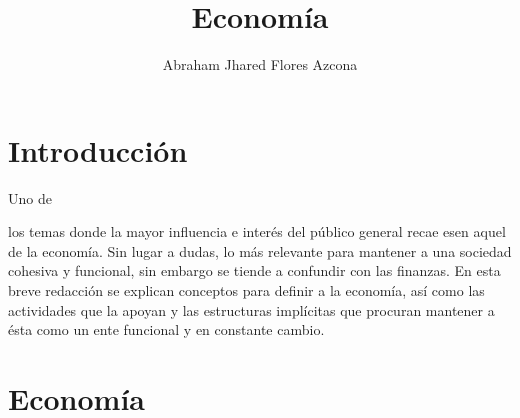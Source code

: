 \documentclass[stu, 12pt, letterpaper, donotrepeattitle, floatsintext, natbib]{apa7}
\title{\Large Economía}
\author{Abraham Jhared Flores Azcona} %
\affiliation{Instituto Tecnológico de Tijuana}
\begin{document}
\maketitle


\renewcommand\contentsname{Contenido}
\tableofcontents
\renewcommand{\listfigurename}{Figuras}
\listoffigures

\newpage
\section*{Introducción}
Uno de \begin{justifying}
    los temas donde la mayor influencia e interés del público general recae esen aquel de la economía. Sin lugar a dudas, lo más relevante
    para mantener a una sociedad cohesiva y funcional, sin embargo se tiende a confundir con las finanzas. En esta breve redacción se explican
    conceptos para definir a la economía, así como las actividades que la apoyan y las estructuras implícitas
    que procuran mantener a ésta como un ente funcional y en constante cambio.\par
\end{justifying}
\vspace{\baselineskip}
\section{Economía}
\end{document}

